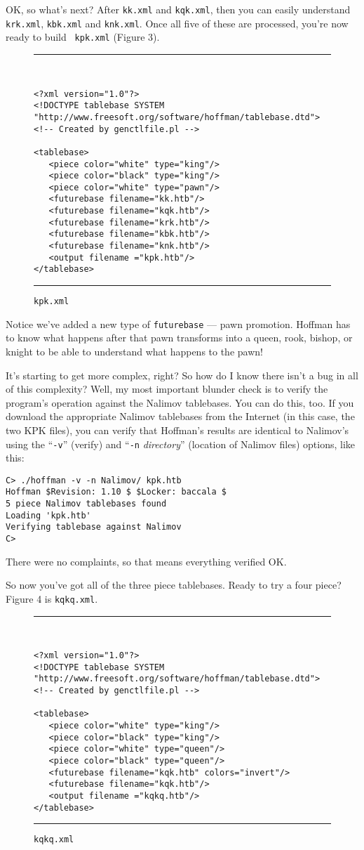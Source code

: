 \documentclass[11pt]{article}
\begin{document}
OK, so what's next?  After {\tt kk.xml} and {\tt kqk.xml}, then you
can easily understand {\tt krk.xml}, {\tt kbk.xml} and {\tt knk.xml}.
Once all five of these are processed, you're now ready to build {\tt
kpk.xml} (Figure 3).

\begin{figure}
\hrule\ 
{\small\begin{verbatim}
<?xml version="1.0"?>
<!DOCTYPE tablebase SYSTEM "http://www.freesoft.org/software/hoffman/tablebase.dtd">
<!-- Created by genctlfile.pl -->

<tablebase>
   <piece color="white" type="king"/>
   <piece color="black" type="king"/>
   <piece color="white" type="pawn"/>
   <futurebase filename="kk.htb"/>
   <futurebase filename="kqk.htb"/>
   <futurebase filename="krk.htb"/>
   <futurebase filename="kbk.htb"/>
   <futurebase filename="knk.htb"/>
   <output filename ="kpk.htb"/>
</tablebase>
\end{verbatim}}
\hrule
\caption{\tt kpk.xml}
\end{figure}

Notice we've added a new type of {\tt futurebase} --- pawn promotion.
Hoffman has to know what happens after that pawn transforms into a
queen, rook, bishop, or knight to be able to understand what happens
to the pawn!

It's starting to get more complex, right?  So how do I know there
isn't a bug in all of this complexity?  Well, my most important
blunder check is to verify the program's operation against the Nalimov
tablebases.  You can do this, too.  If you download the appropriate
Nalimov tablebases from the Internet (in this case, the two KPK
files), you can verify that Hoffman's results are identical to
Nalimov's using the ``{\tt -v}'' (verify) and ``{\tt -n} {\it
directory}'' (location of Nalimov files) options, like this:

\begin{verbatim}
C> ./hoffman -v -n Nalimov/ kpk.htb
Hoffman $Revision: 1.10 $ $Locker: baccala $
5 piece Nalimov tablebases found
Loading 'kpk.htb'
Verifying tablebase against Nalimov
C>
\end{verbatim}

There were no complaints, so that means everything verified OK.

So now you've got all of the three piece tablebases.  Ready to try a
four piece?  Figure 4 is {\tt kqkq.xml}.

\begin{figure}
\hrule\ 
{\small\begin{verbatim}
<?xml version="1.0"?>
<!DOCTYPE tablebase SYSTEM "http://www.freesoft.org/software/hoffman/tablebase.dtd">
<!-- Created by genctlfile.pl -->

<tablebase>
   <piece color="white" type="king"/>
   <piece color="black" type="king"/>
   <piece color="white" type="queen"/>
   <piece color="black" type="queen"/>
   <futurebase filename="kqk.htb" colors="invert"/>
   <futurebase filename="kqk.htb"/>
   <output filename ="kqkq.htb"/>
</tablebase>
\end{verbatim}}
\hrule
\caption{\tt kqkq.xml}
\end{figure}
\end{document}
